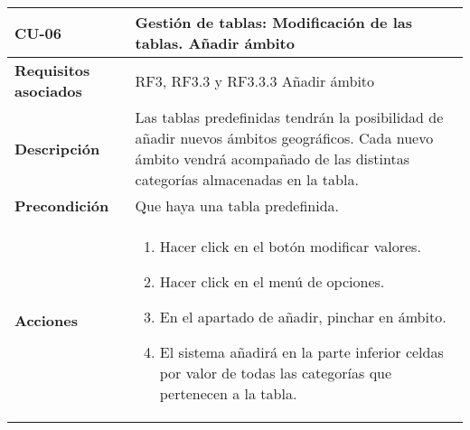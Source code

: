 \newpage
\begin{longtable}[H]{@{}ll@{}}
\toprule
\begin{minipage}[b]{0.23\columnwidth}\raggedright\strut
\textbf{CU-06}\strut
\end{minipage} & \begin{minipage}[b]{0.71\columnwidth}\raggedright\strut
\textbf{Gestión de tablas: Modificación de las tablas. Añadir ámbito}\strut
\end{minipage}\tabularnewline
\midrule
\endhead
\begin{minipage}[t]{0.23\columnwidth}\raggedright\strut
\textbf{Requisitos asociados}\strut
\end{minipage} & \begin{minipage}[t]{0.71\columnwidth}\raggedright\strut
RF3, RF3.3 y RF3.3.3 Añadir ámbito\strut
\end{minipage}\tabularnewline
\begin{minipage}[t]{0.23\columnwidth}\raggedright\strut
\textbf{Descripción}\strut
\end{minipage} & \begin{minipage}[t]{0.71\columnwidth}\raggedright\strut
Las tablas predefinidas tendrán la posibilidad de añadir nuevos ámbitos
geográficos. Cada nuevo ámbito vendrá acompañado de las distintas
categorías almacenadas en la tabla.
\strut
\end{minipage}\tabularnewline
\begin{minipage}[t]{0.23\columnwidth}\raggedright\strut
\textbf{Precondición}\strut
\end{minipage} & \begin{minipage}[t]{0.71\columnwidth}\raggedright\strut
Que haya una tabla predefinida.\strut
\end{minipage}\tabularnewline
\begin{minipage}[t]{0.23\columnwidth}\raggedright\strut
\textbf{Acciones}\strut
\end{minipage} & \begin{minipage}[t]{0.71\columnwidth}\raggedright\strut
\begin{enumerate}
\def\labelenumi{\arabic{enumi}.}
\tightlist
\item
Hacer click en el botón modificar valores.
\item
Hacer click en el menú de opciones.
\item
En el apartado de añadir, pinchar en ámbito.
\item
El sistema añadirá en la parte inferior celdas por valor de todas las
categorías que pertenecen a la tabla.

\end{enumerate}
\end{minipage}
\end{longtable}
